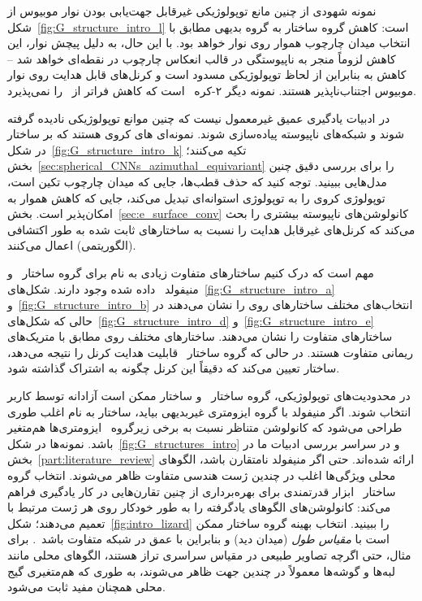 نمونه شهودی از چنین مانع توپولوژیکی غیرقابل جهت‌یابی بودن نوار موبیوس از شکل~\ref{fig:G_structure_intro_l} است:
کاهش گروه ساختار به گروه بدیهی  مطابق با انتخاب میدان چارچوب هموار روی نوار خواهد بود.
با این حال، به دلیل پیچش نوار، این کاهش لزوماً منجر به ناپیوستگی در قالب انعکاس چارچوب در نقطه‌ای خواهد شد
-- کاهش به  بنابراین از لحاظ توپولوژیکی مسدود است و کرنل‌های قابل هدایت  روی نوار موبیوس اجتناب‌ناپذیر هستند.
نمونه دیگر ۲-کره~ است که کاهش فراتر از~ را نمی‌پذیرد.


در ادبیات یادگیری عمیق غیرمعمول نیست
که چنین موانع توپولوژیکی نادیده گرفته شوند و شبکه‌های ناپیوسته پیاده‌سازی شوند.
نمونه‌ای های کروی هستند که بر ساختار  در شکل~\ref{fig:G_structure_intro_k} تکیه می‌کنند؛ بخش~\ref{sec:spherical_CNNs_azimuthal_equivariant} را برای بررسی دقیق چنین مدل‌هایی ببینید.
توجه کنید که حذف قطب‌ها، جایی که میدان چارچوب تکین است، توپولوژی کروی را به توپولوژی استوانه‌ای تبدیل می‌کند، جایی که کاهش هموار به  امکان‌پذیر است.
بخش~\ref{sec:e_surface_conv} کانولوشن‌های \lr{$\GM$} ناپیوسته بیشتری را بحث می‌کند که کرنل‌های غیرقابل هدایت را نسبت به ساختارهای  ثابت شده به طور اکتشافی (الگوریتمی) اعمال می‌کنند.


مهم است که درک کنیم ساختارهای  متفاوت زیادی به نام \lr{$\GM$}
برای گروه ساختار~ و منیفولد~ داده شده وجود دارند.
شکل‌های~\ref{fig:G_structure_intro_a} و~\ref{fig:G_structure_intro_b} انتخاب‌های مختلف ساختارهای  روی  را نشان می‌دهند در حالی که
شکل‌های~\ref{fig:G_structure_intro_d} و~\ref{fig:G_structure_intro_e} ساختارهای  متفاوت را نشان می‌دهند.
ساختارهای  مختلف روی  مطابق با متریک‌های ریمانی متفاوت هستند.
در حالی که گروه ساختار~ قابلیت هدایت  کرنل را نتیجه می‌دهد، ساختار  تعیین می‌کند که دقیقاً این کرنل چگونه به اشتراک گذاشته شود.


در محدودیت‌های توپولوژیکی،
گروه ساختار~ و ساختار  ممکن است آزادانه توسط کاربر انتخاب شوند.
اگر منیفولد با گروه ایزومتری غیربدیهی  بیاید، ساختار  به نام \lr{$\GM$} اغلب طوری طراحی می‌شود که کانولوشن \lr{$\GM$} متناظر نسبت به برخی زیرگروه~ ایزومتری‌ها هم‌متغیر باشد.
نمونه‌ها در شکل~\ref{fig:G_structures_intro} و در سراسر بررسی ادبیات ما در بخش~\ref{part:literature_review} ارائه شده‌اند.
حتی اگر منیفولد نامتقارن باشد، الگوهای محلی ویژگی‌ها اغلب در چندین ژست هندسی متفاوت ظاهر می‌شوند.
انتخاب گروه ساختار~ ابزار قدرتمندی برای بهره‌برداری از چنین تقارن‌هایی در کار یادگیری فراهم می‌کند:
کانولوشن‌های \lr{$\GM$} الگوهای یادگرفته را به طور خودکار روی هر ژست مرتبط با  تعمیم می‌دهند؛ شکل~\ref{fig:intro_lizard} را ببینید.
انتخاب بهینه گروه ساختار ممکن است با \emph{مقیاس طول} (میدان دید) و بنابراین با عمق در شبکه متفاوت باشد~\cite{Weiler2019_E2CNN}.
برای مثال، حتی اگرچه تصاویر طبیعی در مقیاس سراسری تراز هستند، الگوهای محلی مانند لبه‌ها و گوشه‌ها معمولاً در چندین جهت ظاهر می‌شوند، به طوری که هم‌متغیری گیج محلی همچنان مفید ثابت می‌شود.